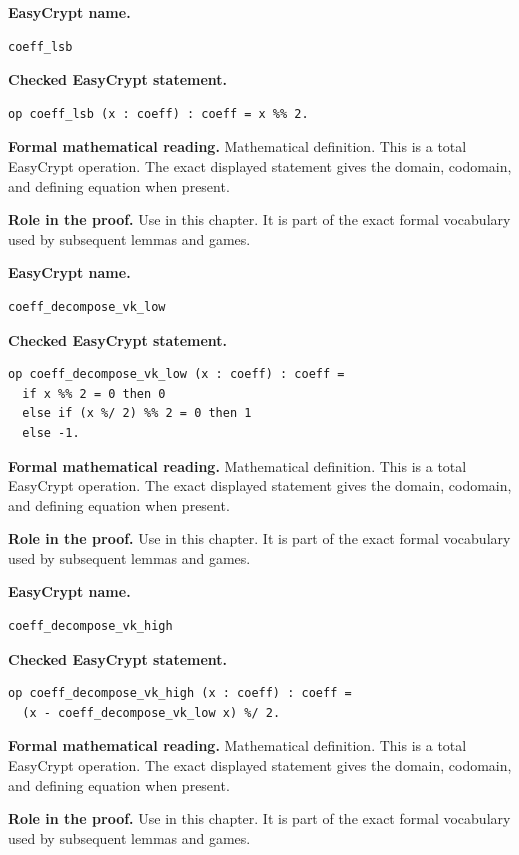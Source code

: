 \begin{formaldefinition}
\noindent\textbf{EasyCrypt name.}
\begin{lstlisting}[language=EasyCrypt,basicstyle=\ttfamily\scriptsize]
coeff_lsb
\end{lstlisting}
\noindent\textbf{Checked EasyCrypt statement.}
\begin{lstlisting}[language=EasyCrypt,basicstyle=\ttfamily\scriptsize]
op coeff_lsb (x : coeff) : coeff = x %% 2.
\end{lstlisting}
\noindent\textbf{Formal mathematical reading.}
Mathematical definition. This is a total EasyCrypt operation.  The exact displayed statement gives the domain, codomain, and defining equation when present.

\noindent\textbf{Role in the proof.}
Use in this chapter. It is part of the exact formal vocabulary used by subsequent lemmas and games.

\end{formaldefinition}

\begin{formaldefinition}
\noindent\textbf{EasyCrypt name.}
\begin{lstlisting}[language=EasyCrypt,basicstyle=\ttfamily\scriptsize]
coeff_decompose_vk_low
\end{lstlisting}
\noindent\textbf{Checked EasyCrypt statement.}
\begin{lstlisting}[language=EasyCrypt,basicstyle=\ttfamily\scriptsize]
op coeff_decompose_vk_low (x : coeff) : coeff =
  if x %% 2 = 0 then 0
  else if (x %/ 2) %% 2 = 0 then 1
  else -1.
\end{lstlisting}
\noindent\textbf{Formal mathematical reading.}
Mathematical definition. This is a total EasyCrypt operation.  The exact displayed statement gives the domain, codomain, and defining equation when present.

\noindent\textbf{Role in the proof.}
Use in this chapter. It is part of the exact formal vocabulary used by subsequent lemmas and games.

\end{formaldefinition}

\begin{formaldefinition}
\noindent\textbf{EasyCrypt name.}
\begin{lstlisting}[language=EasyCrypt,basicstyle=\ttfamily\scriptsize]
coeff_decompose_vk_high
\end{lstlisting}
\noindent\textbf{Checked EasyCrypt statement.}
\begin{lstlisting}[language=EasyCrypt,basicstyle=\ttfamily\scriptsize]
op coeff_decompose_vk_high (x : coeff) : coeff =
  (x - coeff_decompose_vk_low x) %/ 2.
\end{lstlisting}
\noindent\textbf{Formal mathematical reading.}
Mathematical definition. This is a total EasyCrypt operation.  The exact displayed statement gives the domain, codomain, and defining equation when present.

\noindent\textbf{Role in the proof.}
Use in this chapter. It is part of the exact formal vocabulary used by subsequent lemmas and games.

\end{formaldefinition}

